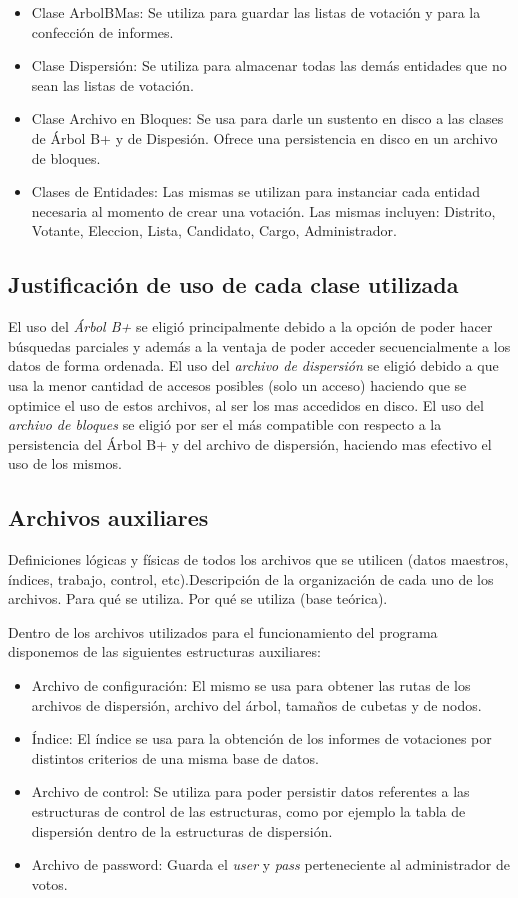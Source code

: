\documentclass[a4paper,10pt]{article}
\begin{document}
\begin{itemize}
\item Clase ArbolBMas: Se utiliza para guardar las listas de votación y para la confección de informes.
\item Clase Dispersión: Se utiliza para almacenar todas las demás entidades que no sean las listas de votación.
\item Clase Archivo en Bloques: Se usa para darle un sustento en disco a las clases de Árbol B+ y de Dispesión. Ofrece una persistencia en disco en un archivo de bloques.
\item Clases de Entidades: Las mismas se utilizan para instanciar cada entidad necesaria al momento de crear una votación. Las mismas incluyen: Distrito, Votante, Eleccion, Lista, Candidato, Cargo, Administrador.
\end{itemize}	


\subsection{Justificación de uso de cada clase utilizada}
    El uso del \textit{Árbol B+} se eligió principalmente debido a la opción de poder hacer búsquedas parciales y además a la ventaja de poder acceder secuencialmente a los datos de forma ordenada.
    El uso del \textit{archivo de dispersión} se eligió debido a que usa la menor cantidad de accesos posibles (solo un acceso) haciendo que se optimice el uso de estos archivos, al ser los mas accedidos en disco.
    El uso del \textit{archivo de bloques} se eligió por ser el más compatible con respecto a la persistencia del Árbol B+ y del archivo de dispersión, haciendo mas efectivo el uso de los mismos.

\subsection{Archivos auxiliares}
Definiciones lógicas y físicas de todos los archivos que se utilicen (datos maestros, índices, trabajo, control, etc).Descripción de la organización de cada uno de los archivos.  Para qué se utiliza. Por qué se utiliza (base teórica).

Dentro de los archivos utilizados para el funcionamiento del programa disponemos de las siguientes estructuras auxiliares:

\begin{itemize}
\item Archivo de configuración: El mismo se usa para obtener las rutas de los archivos de dispersión, archivo del árbol, tamaños de cubetas y de nodos.
\item Índice: El índice se usa para la obtención de los informes de votaciones por distintos criterios de una misma base de datos.
\item Archivo de control: Se utiliza para poder persistir datos referentes a las estructuras de control de las estructuras, como por ejemplo la tabla de dispersión dentro de la estructuras de dispersión.
\item Archivo de password: Guarda el \textit{user} y \textit{pass} perteneciente al administrador de votos.
\end{itemize}	
\end{document}
